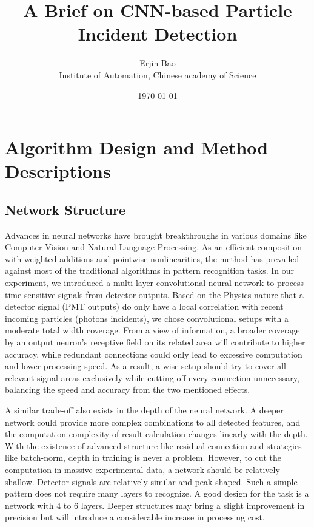 \documentclass[12pt]{article}
\begin{document}
\title{A Brief on CNN-based Particle Incident Detection}
\author{Erjin Bao\\Institute of Automation, Chinese academy of Science}
\date{\today}
\maketitle

\section{Algorithm Design and Method Descriptions}
\subsection{Network Structure}

Advances in neural networks have brought breakthroughs in various domains like Computer Vision and Natural Language Processing. As an efficient composition with weighted additions and pointwise nonlinearities, the method has prevailed against most of the traditional algorithms in pattern recognition tasks. In our experiment, we introduced a multi-layer convolutional neural network to process time-sensitive signals from detector outputs. Based on the Physics nature that a detector signal (PMT outputs) do only have a local correlation with recent incoming particles (photons incidents), we chose convolutional setups with a moderate total width coverage. From a view of information, a broader coverage by an output neuron's receptive field on its related area will contribute to higher accuracy, while redundant connections could only lead to excessive computation and lower processing speed. As a result, a wise setup should try to cover all relevant signal areas exclusively while cutting off every connection unnecessary, balancing the speed and accuracy from the two mentioned effects.

A similar trade-off also exists in the depth of the neural network. A deeper network could provide more complex combinations to all detected features, and the computation complexity of result calculation changes linearly with the depth. With the existence of advanced structure like residual connection and strategies like batch-norm, depth in training is never a problem. However, to cut the computation in massive experimental data, a network should be relatively shallow. Detector signals are relatively similar and peak-shaped. Such a simple pattern does not require many layers to recognize. A good design for the task is a network with 4 to 6 layers. Deeper structures may bring a slight improvement in precision but will introduce a considerable increase in processing cost.
\end{document}
